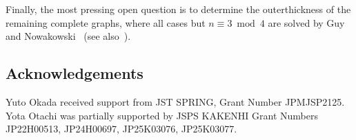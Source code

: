 \documentclass[unicode,runningheads,envcountsame,a4paper,dvipsnames,12pt]{llncs}
\begin{document}
	Finally, the most pressing open question is to determine the outerthickness of the remaining complete graphs, where all cases but \(n \equiv 3 \bmod 4\) are solved 
	by Guy and Nowakowski~\cite{Guy1990} (see also~\cite{GuyNowakowski1990b}).
	
	\subsection*{Acknowledgements}
	
	Yuto Okada received support from JST SPRING, Grant Number JPMJSP2125. Yota Otachi was partially supported by JSPS KAKENHI Grant Numbers
	JP22H00513, %
	JP24\-H00697, %
	JP25\-K03076, %
	JP25K03077. %
	


	
\end{document}
